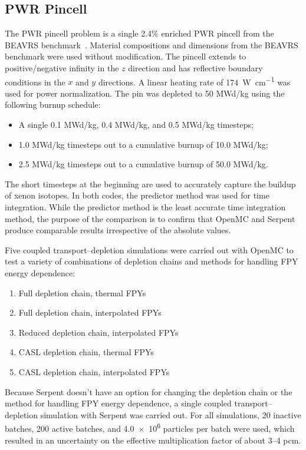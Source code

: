 \documentclass[3p,authoryear]{elsarticle}
\begin{document}
\subsection{PWR Pincell}

The PWR pincell problem is a single 2.4\% enriched PWR pincell from the BEAVRS
benchmark~\citep{horelik2013mc,horelik2018mit}. Material compositions and
dimensions from the BEAVRS benchmark were used without modification. The pincell
extends to positive/negative infinity in the $z$ direction and has reflective
boundary conditions in the $x$ and $y$ directions. A linear heating rate of
\SI{174}{\watt\per\centi\meter} was used for power normalization. The pin was
depleted to 50 MWd/kg using the following burnup schedule:
\begin{itemize}
  \item A single 0.1 MWd/kg, 0.4 MWd/kg, and 0.5 MWd/kg timesteps;
  \item 1.0 MWd/kg timesteps out to a cumulative burnup of 10.0 MWd/kg;
  \item 2.5 MWd/kg timesteps out to a cumulative burnup of 50.0 MWd/kg.
\end{itemize}
The short timesteps at the beginning are used to accurately capture the buildup
of xenon isotopes. In both codes, the predictor method was used for time
integration. While the predictor method is the least accurate time integration
method, the purpose of the comparison is to confirm that OpenMC and Serpent
produce comparable results irrespective of the absolute values.

Five coupled transport--depletion simulations were carried out with OpenMC to test
a variety of combinations of depletion chains and methods for handling FPY
energy dependence:
\begin{enumerate}
  \item Full depletion chain, thermal FPYs
  \item Full depletion chain, interpolated FPYs
  \item Reduced depletion chain, interpolated FPYs
  \item CASL depletion chain, thermal FPYs
  \item CASL depletion chain, interpolated FPYs
\end{enumerate}
Because Serpent doesn't have an option for changing the depletion chain or the
method for handling FPY energy dependence, a single coupled transport--depletion
simulation with Serpent was carried out. For all simulations, 20 inactive
batches, 200 active batches, and \num{4.0e6} particles per batch were used,
which resulted in an uncertainty on the effective multiplication factor of about
3--4 pcm.
\end{document}
